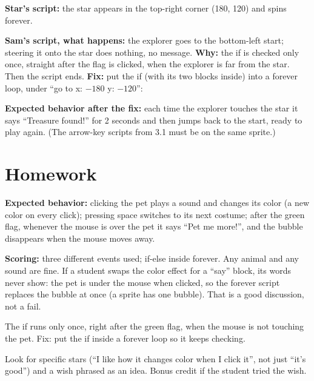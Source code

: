 \begin{answer}
\textbf{Star's script:} the star appears in the top-right corner (180, 120) and spins forever.

\textbf{Sam's script, what happens:} the explorer goes to the bottom-left start; steering it onto the star does nothing, no message.
\textbf{Why:} the if is checked only once, straight after the flag is clicked, when the explorer is far from the star. Then the script ends.
\textbf{Fix:} put the if (with its two blocks inside) into a forever loop, under \enquote{go to x: $-180$ y: $-120$}:
\begin{center}
\begin{scratch}[scale=0.8]
\end{scratch}
\end{center}
\textbf{Expected behavior after the fix:} each time the explorer touches the star it says \enquote{Treasure found!} for 2 seconds and then jumps back to the start, ready to play again. (The arrow-key scripts from 3.1 must be on the same sprite.)
\end{answer}

\section{Homework}
\begin{answer}
\textbf{Expected behavior:} clicking the pet plays a sound and changes its color (a new color on every click); pressing space switches to its next costume; after the green flag, whenever the mouse is over the pet it says \enquote{Pet me more!}, and the bubble disappears when the mouse moves away.

\textbf{Scoring:} three different events used; if-else inside forever. Any animal and any sound are fine. If a student swaps the color effect for a \enquote{say} block, its words never show: the pet is under the mouse when clicked, so the forever script replaces the bubble at once (a sprite has one bubble). That is a good discussion, not a fail.
\end{answer}

\begin{answer}
The if runs only once, right after the green flag, when the mouse is not touching the pet. Fix: put the if inside a forever loop so it keeps checking.
\end{answer}

\begin{answer}
Look for specific stars (\enquote{I like how it changes color when I click it}, not just \enquote{it's good}) and a wish phrased as an idea. Bonus credit if the student tried the wish.
\end{answer}
